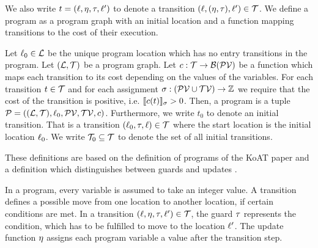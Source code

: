We also write $t = (\ell, \eta, \tau, \ell')$ to denote a transition $(\ell, (\eta, \tau), \ell') \in \mathcal{T}$.
We define a program as a program graph with an initial location and a function mapping transitions to the cost of their execution.

\begin{definition}[Program] 
  Let $\ell_0 \in \mathcal{L}$ be the unique program location which has no entry transitions in the program.
  Let $(\mathcal{L}, \mathcal{T})$ be a program graph.
  Let $c: \mathcal{T} \rightarrow \mathcal{B}(\mathcal{PV})$ be a function which maps each transition to its cost depending on the values of the variables.
  For each transition $t \in \mathcal{T}$ and for each assignment $\sigma: (\mathcal{PV} \cup \mathcal{TV}) \rightarrow \mathbb{Z}$ we require that the cost of the transition is positive, i.e. $\llbracket c(t) \rrbracket_{\sigma} > 0$.
  Then, a program is a tuple $\mathcal{P} = ((\mathcal{L}, \mathcal{T}), \ell_0, \mathcal{PV}, \mathcal{TV}, c)$.
  Furthermore, we write $t_0$ to denote an initial transition.
  That is a transition $(\ell_0, \tau, \ell) \in \mathcal{T}$ where the start location is the initial location $\ell_0$.
  We write $\mathcal{T}_0 \subseteq \mathcal{T}$ to denote the set of all initial transitions.
\end{definition}

These definitions are based on the definition of programs of the KoAT paper \cite{koat} and a definition which distinguishes between guards and updates \cite{lowerruntime}.

In a program, every variable is assumed to take an integer value.
A transition defines a possible move from one location to another location, if certain conditions are met.
In a transition $(\ell,\eta,\tau,\ell') \in \mathcal{T}$, the guard $\tau$ represents the condition, which has to be fulfilled to move to the location $\ell'$.
The update function $\eta$ assigns each program variable a value after the transition step.

